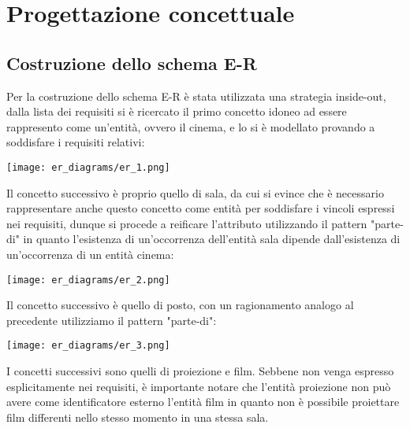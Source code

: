 \section{Progettazione concettuale}

\subsection*{Costruzione dello schema E-R}
%
%
Per la costruzione dello schema E-R è stata utilizzata una strategia inside-out,
dalla lista dei requisiti si è ricercato il primo concetto idoneo ad essere
rappresento come un'entità, ovvero il cinema, e lo si è modellato provando a
soddisfare i requisiti relativi:

\begin{center}
    \texttt{[image: er\_diagrams/er\_1.png]}
\end{center}

Il concetto successivo è proprio quello di sala, da cui si evince che è
necessario rappresentare anche questo concetto come entità per soddisfare i
vincoli espressi nei requisiti, dunque si procede a reificare l'attributo
utilizzando il pattern "parte-di" in quanto l'esistenza di un'occorrenza
dell'entità sala dipende dall'esistenza di un'occorrenza di un entità cinema:

\begin{center}
    \texttt{[image: er\_diagrams/er\_2.png]}
\end{center}

Il concetto successivo è quello di posto, con un ragionamento analogo al
precedente utilizziamo il pattern "parte-di":

\begin{center}
    \texttt{[image: er\_diagrams/er\_3.png]}
\end{center}

\pagebreak

I concetti successivi sono quelli di proiezione e film. Sebbene non venga
espresso esplicitamente nei requisiti, è importante notare che l'entità
proiezione non può avere come identificatore esterno l'entità film in quanto
non è possibile proiettare film differenti nello stesso momento in una stessa
sala.

